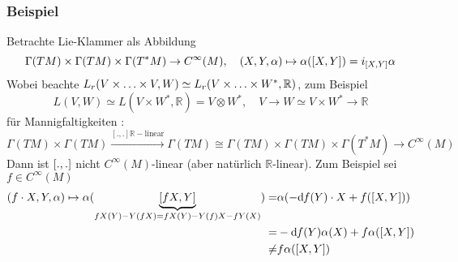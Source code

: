 \subsubsection{Beispiel}
\label{ssub:177}
Betrachte Lie-Klammer als Abbildung
\[
\Gamma(TM)\times \Gamma(TM)\times \Gamma(T^* M) \to C^\infty (M),\quad (X,Y,\alpha)\mapsto \alpha([X,Y]) = i_{[X,Y]} \alpha
\]
Wobei beachte $L_r(V\times\ldots \times V,W)\simeq L_r(V\times \ldots \times W^*,\mathbb{R})$, zum Beispiel 
\[
L(V,W) \simeq L(V\times W^*,\mathds{R}) = V\otimes W^*,\quad V\to W \simeq V\times W^* \to \mathds{R}
\]
für Mannigfaltigkeiten :
\[
\Gamma(TM)\times \Gamma(TM) \xrightarrow{[.,.] \mathds{R}-\text{linear}} \Gamma(TM) \cong \Gamma(TM)\times \Gamma(TM)\times \Gamma(T^* M) \to C^\infty (M)
\]
Dann ist $[.,.]$ nicht $C^\infty (M)$-linear (aber natürlich $\mathds{R}$-linear). Zum Beispiel sei $f\in C^\infty (M)$
\begin{align*}
(f\cdot X, Y,\alpha) \mapsto \alpha(\underbrace{[fX,Y]}_{
fX(Y)-Y(fX) = fX(Y) - Y(f)X - fY(X)
}) =& \alpha(-\mathrm{d}\mkern-1.0mu f(Y)\cdot X + f([X,Y]))\\
=& -\mathrm{d}\mkern-1.0mu f(Y)\alpha(X) + f\alpha([X,Y])\\
\neq& f\alpha([X,Y])
\end{align*}

